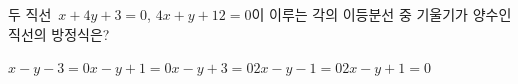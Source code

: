 두 직선~$x+4y+3=0$, $4x+y+12=0$이 이루는 각의 이등분선 중 기울기가 양수인 직선의 방정식은?
\begin{choicesii}{$x-y-3=0$}{$x-y+1=0$}{$x-y+3=0$}{$2x-y-1=0$}{$2x-y+1=0$}\end{choicesii}
